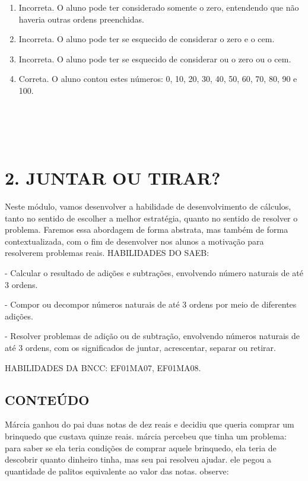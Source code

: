 \begin{enumerate}
\def\labelenumi{\alph{enumi})}
\item
  Incorreta. O aluno pode ter considerado somente o zero, entendendo que
  não haveria outras ordens preenchidas.
\item
  Incorreta. O aluno pode ter se esquecido de considerar o zero e o cem.
\item
  Incorreta. O aluno pode ter se esquecido de considerar ou o zero ou
  o cem.
\item
  Correta. O aluno contou estes números: 0, 10, 20, 30, 40, 50, 60, 70, 80,
  90 e 100.
\end{enumerate}

\section{\texorpdfstring{\\
}{ }}\label{section-7}

\section{2. JUNTAR OU TIRAR?}\label{muxf3dulo-2-juntar-ou-tirar}

Neste módulo, vamos desenvolver a habilidade de desenvolvimento de
cálculos, tanto no sentido de escolher a melhor estratégia, quanto no
sentido de resolver o problema. Faremos essa abordagem de forma
abstrata, mas também de forma contextualizada, com o fim de desenvolver
nos alunos a motivação para resolverem problemas reais.
HABILIDADES DO SAEB:

- Calcular o resultado de adições e subtrações, envolvendo número
naturais de até 3 ordens.

- Compor ou decompor números naturais de até 3 ordens por meio de
diferentes adições.

- Resolver problemas de adição ou de subtração, envolvendo números
naturais de até 3 ordens, com os significados de juntar, acrescentar,
separar ou retirar.

HABILIDADES DA BNCC:
EF01MA07, EF01MA08.

\subsection{CONTEÚDO}\label{conteuxfado-1}

Márcia ganhou do pai duas notas de dez reais e decidiu que
queria comprar um brinquedo que custava quinze reais. márcia percebeu
que tinha um problema: para saber se ela teria condições de comprar
aquele brinquedo, ela teria de descobrir quanto dinheiro tinha, mas seu pai
resolveu ajudar. ele pegou a quantidade de palitos equivalente ao valor das
notas. observe:


